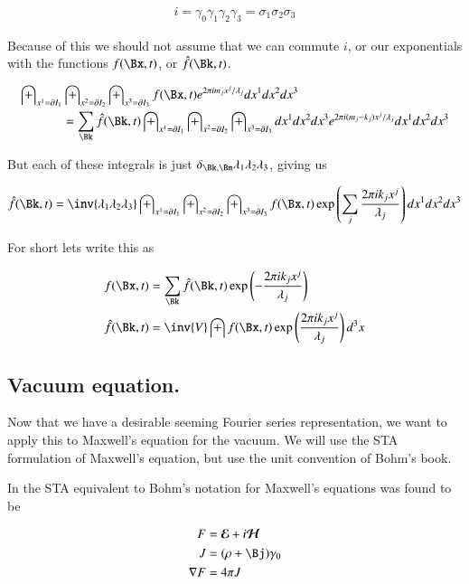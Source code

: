 \documentclass{article}
\newcommand{\EE}[0]{\boldsymbol{\mathcal{E}}}
\newcommand{\HH}[0]{\boldsymbol{\mathcal{H}}}
\begin{document}
\begin{align*}
i = \gamma_0 \gamma_1 \gamma_2 \gamma_3 = \sigma_1 \sigma_2 \sigma_3
\end{align*}

Because of this we should not assume that we can commute $i$, or our exponentials with the functions $f(\Bx,t)$, or $\hat{f}(\Bk,t)$.

\begin{align*}
\int_{x^1 = \partial I_1} &\int_{x^2 = \partial I_2} \int_{x^3 = \partial I_3} f(\Bx, t) 
e^{ 2 \pi i m_j x^j/\lambda_j}
dx^1 dx^2 dx^3 \\
&= \sum_{\Bk} \hat{f}(\Bk, t) \int_{x^1 = \partial I_1} \int_{x^2 = \partial I_2} \int_{x^3 = \partial I_3} dx^1 dx^2 dx^3 e^{ 2 \pi i (m_j - k_j) x^j/\lambda_j} dx^1 dx^2 dx^3
\end{align*}

But each of these integrals is just $\delta_{\Bk,\Bm} \lambda_1 \lambda_2 \lambda_3$, giving us

\begin{align*}
\hat{f}(\Bk, t)
&= \inv{\lambda_1 \lambda_2 \lambda_3 } \int_{x^1 = \partial I_1} \int_{x^2 = \partial I_2} \int_{x^3 = \partial I_3} f(\Bx, t) \exp\left( \sum_j \frac{2 \pi i k_j x^j}{\lambda_j} \right) dx^1 dx^2 dx^3 \\
\end{align*}

For short lets write this as

\begin{align}
f(\Bx, t) &= \sum_{\Bk} \hat{f}(\Bk, t) \exp\left( - \frac{2 \pi i k_j x^j }{\lambda_j} \right) \\
\hat{f}(\Bk, t) &= \inv{V} \int f(\Bx, t) \exp\left( \frac{2 \pi i k_j x^j}{\lambda_j} \right) d^3 x
\end{align}

\subsection{ Vacuum equation. }

Now that we have a desirable seeming Fourier series representation, we 
want to apply this to Maxwell's equation for the vacuum.  We will use the 
STA formulation of Maxwell's equation, but use the unit convention of Bohm's
book.

In \cite{PJrayleighJeans} the STA equivalent to Bohm's notation for Maxwell's equations was found to be

\begin{align}
F &= \EE + i\HH \\
J &= (\rho + \Bj) \gamma_0 \\
\grad F &= 4 \pi J
\end{align}
\end{document}
